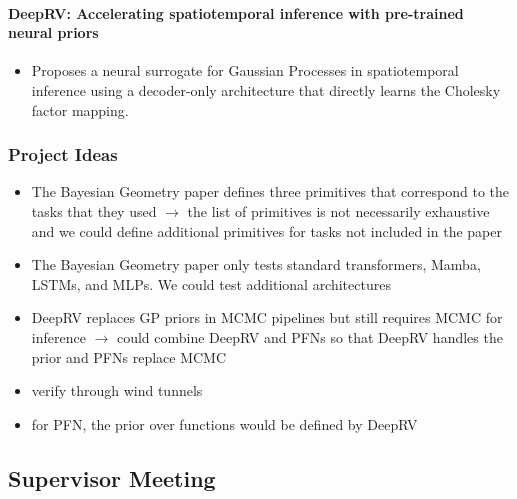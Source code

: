 \documentclass[12pt,a4paper,twoside]{article}
\begin{document}
\paragraph{DeepRV: Accelerating spatiotemporal inference with pre-trained neural priors~\cite{Navott2025}}
\begin{itemize}
	\item Proposes a neural surrogate for Gaussian Processes in spatiotemporal inference using a decoder-only architecture that directly learns the Cholesky factor mapping.
\end{itemize}

\subsubsection{Project Ideas}
\begin{itemize}
	\item The Bayesian Geometry paper defines three primitives that correspond to the tasks that they used $\rightarrow$ the list of primitives is not necessarily exhaustive and we could define additional primitives for tasks not included in the paper
	\item The Bayesian Geometry paper only tests standard transformers, Mamba, LSTMs, and MLPs. We could test additional architectures
	\item DeepRV replaces GP priors in MCMC pipelines but still requires MCMC for inference $\rightarrow$ could combine DeepRV and PFNs so that DeepRV handles the prior and PFNs replace MCMC
	\item[$\rightarrow$] verify through wind tunnels
	\item[$\rightarrow$] for PFN, the prior over functions would be defined by DeepRV
\end{itemize}

\subsection{Supervisor Meeting}
\end{document}
